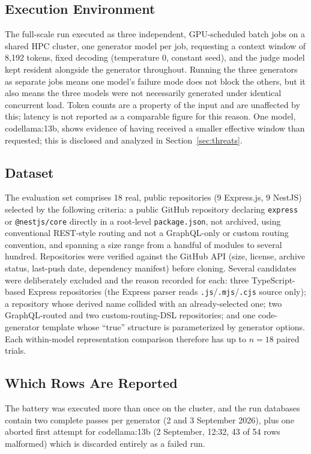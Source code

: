 \documentclass[conference]{IEEEtran}
\begin{document}
\subsection{Execution Environment}
\label{sec:setup-exec}
The full-scale run executed as three independent, GPU-scheduled batch jobs on a shared HPC
cluster, one generator model per job, requesting a context window of 8{,}192 tokens, fixed
decoding (temperature 0, constant seed), and the judge model kept resident alongside the
generator throughout. Running the three generators as separate jobs means one model's failure
mode does not block the others, but it also means the three models were not necessarily
generated under identical concurrent load. Token counts are a property of the input and are
unaffected by this; latency is not reported as a comparable figure for this reason. One model,
codellama:13b, shows evidence of having received a smaller effective window than requested; this
is disclosed and analyzed in Section~\ref{sec:threats}.

\subsection{Dataset}
\label{sec:dataset}
The evaluation set comprises 18 real, public repositories (9 Express.js, 9 NestJS) selected by
the following criteria: a public GitHub repository declaring \texttt{express} or
\texttt{@nestjs/core} directly in a root-level \texttt{package.json}, not archived, using
conventional REST-style routing and not a GraphQL-only or custom routing convention, and
spanning a size range from a handful of modules to several hundred. Repositories were verified
against the GitHub API (size, license, archive status, last-push date, dependency manifest)
before cloning. Several candidates were deliberately excluded and the reason recorded for each:
three TypeScript-based Express repositories (the Express parser reads
\texttt{.js}/\texttt{.mjs}/\texttt{.cjs} source only); a repository whose derived name collided
with an already-selected one; two GraphQL-routed and two custom-routing-DSL repositories; and
one code-generator template whose ``true'' structure is parameterized by generator options.
Each within-model representation comparison therefore has up to $n=18$ paired trials.

\subsection{Which Rows Are Reported}
\label{sec:whichrun}
The battery was executed more than once on the cluster, and the run databases contain two
complete passes per generator (2 and 3 September 2026), plus one aborted first attempt for
codellama:13b (2 September, 12:32, 43 of 54 rows malformed) which is discarded entirely as a
failed run.
\end{document}
